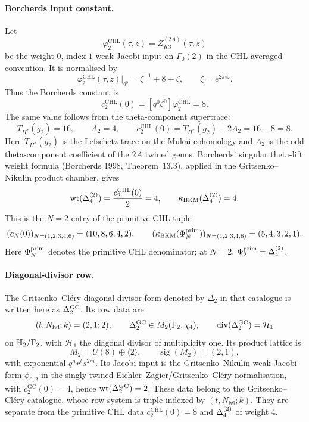 \paragraph{Borcherds input constant.}
Let
\[
  \varphi^{\mathrm{CHL}}_2(\tau,z)
  =Z^{(2A)}_{K3}(\tau,z)
\]
be the weight-$0$, index-$1$ weak Jacobi input on $\Gamma_0(2)$ in the
CHL-averaged convention.  It is normalised by
\[
  \varphi^{\mathrm{CHL}}_2(\tau,z)\big|_{q^0}
  =
  \zeta^{-1}+8+\zeta ,
  \qquad \zeta=e^{2\pi iz}.
\]
Thus the Borcherds constant is
\[
  c^{\mathrm{CHL}}_2(0)
  =[q^0\zeta^0]\varphi^{\mathrm{CHL}}_2=8.
\]
The same value follows from the theta-component supertrace:
\[
  T_{H^*}(g_2)=16,\qquad A_2=4,\qquad
  c^{\mathrm{CHL}}_2(0)=T_{H^*}(g_2)-2A_2=16-8=8.
\]
Here $T_{H^*}(g_2)$ is the Lefschetz trace on the Mukai cohomology and
$A_2$ is the odd theta-component coefficient of the $2A$ twined genus.
Borcherds' singular theta-lift weight formula (Borcherds 1998,
Theorem~13.3), applied in the Gritsenko--Nikulin product chamber, gives
\[
  \operatorname{wt}(\Delta_{4}^{(2)})=\frac{c^{\mathrm{CHL}}_2(0)}{2}=4,
  \qquad
  \kappa_{\mathrm{BKM}}(\Delta_{4}^{(2)})=4.
\]
This is the $N=2$ entry of the primitive CHL tuple
\[
  (c_N(0))_{N=(1,2,3,4,6)}=(10,8,6,4,2),
  \qquad
  (\kappa_{\mathrm{BKM}}(\Phi^{\mathrm{prim}}_N))_{N=(1,2,3,4,6)}=(5,4,3,2,1).
\]
Here $\Phi^{\mathrm{prim}}_N$ denotes the primitive CHL denominator; at $N=2$,
$\Phi^{\mathrm{prim}}_2=\Delta_{4}^{(2)}$.

\paragraph{Diagonal-divisor row.}
The Gritsenko--Cl\'ery diagonal-divisor form denoted by $\Delta_2$ in
that catalogue is written here as $\Delta_{2}^{\mathrm{GC}}$.  Its row data are
\[
  (t,N_{\mathrm{lvl}};k)=(2,1;2),
  \qquad
  \Delta_{2}^{\mathrm{GC}}\in M_2(\Gamma_2,\chi_4),
  \qquad
  \operatorname{div}(\Delta_{2}^{\mathrm{GC}})=\mathcal H_1
\]
on $\mathbb{H}_{2}/\Gamma_2$, with $\mathcal H_1$ the diagonal divisor of
multiplicity one.  Its product lattice is
\[
  M_2=U(8)\oplus\langle 2\rangle,
  \qquad \operatorname{sig}(M_2)=(2,1),
\]
with exponential $q^n r^\ell s^{2m}$.  Its Jacobi input is the
Gritsenko--Nikulin weak Jacobi form $\phi_{0,2}$ in the singly-twined
Eichler--Zagier/Gritsenko--Cl\'ery normalisation, with
$c^{\mathrm{GC}}_2(0)=4$, hence $\operatorname{wt}(\Delta_{2}^{\mathrm{GC}})=2$.  These data belong
to the Gritsenko--Cl\'ery catalogue, whose row system is
triple-indexed by $(t,N_{\mathrm{lvl}};k)$.  They are separate from the
primitive CHL data $c^{\mathrm{CHL}}_2(0)=8$ and $\Delta_{4}^{(2)}$ of weight
$4$.

